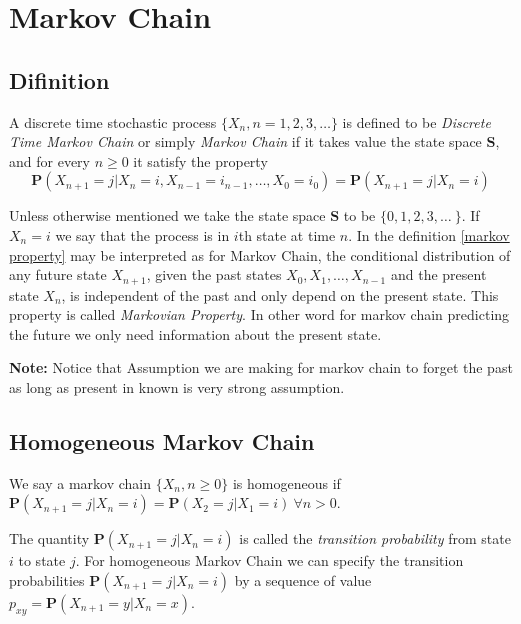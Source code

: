 \chapter{Markov Chain}

\section{Difinition}

\begin{definition}
    A discrete time stochastic process $\{X_n,n=1,2,3,\ldots\}$ is defined to be \textit{Discrete Time Markov Chain} or simply \textit{Markov Chain}
    if it takes value  the state space $ \mathbf{S} $, and for every
    $n\ge 0$ it satisfy the property
    \begin{equation}
        \label{markov property}
         \mathbf{P}( X_{n+1} = j | X_n =i , X_{n-1} = i_{n-1}, \ldots, X_0 = i_0 ) = \mathbf{P}( X_{n+1} = j | X_n =i )
    \end{equation}
\end{definition}

Unless otherwise mentioned we take the state space $ \mathbf{S} $ to be $\{0, 1, 2, 3, \ldots\ \} $. 
If $X_n = i $ we say that the process is in $i $th state at time $n$.
In the definition \cref{markov property} may be interpreted as for Markov Chain, the conditional distribution of any future state $ X_{n+1} $, given the past states  $ X_0, X_1,\ldots, X_{n-1} $  and the present state $ X_n $, is independent of the past and only depend on the present state.
This property is called \textit{Markovian Property}. In other word for markov chain predicting the future we only need information about the present state.

\textbf{Note:} Notice that Assumption we are making for markov chain to forget the past as long as present in known is very strong assumption.

\section{Homogeneous Markov Chain}

\begin{definition}
    We say a markov chain $ \{ X_n,n\ge 0 \} $ is homogeneous if $ \mathbf{P}(X_{n+1}=j|X_n=i)=\mathbf{P}(X_2=j|X_1=i) \ \forall n>0 $. 
\end{definition}

The quantity $ \mathbf{P}(X_{n+1}=j|X_n=i) $ is called the \textit{transition probability} from state $i$ to state $j$. For homogeneous Markov Chain 
we can specify the transition probabilities $ \mathbf{P}(X_{n+1}=j|X_{n}=i) $ by a sequence of value $ p_{xy} = \mathbf{P}(X_{n+1}=y|X_{n}=x) $.

